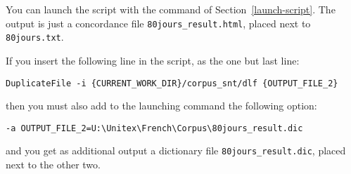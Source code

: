 \noindent You can launch the script with the command of Section~\ref{launch-script}. The output
is just a concordance file \verb$80jours_result.html$, placed next to \verb$80jours.txt$.

\bigskip
\noindent If you insert the following line in the script, as the one but last line:

\begin{Verbatim}[fontsize=\small,fontfamily=helvetica]
DuplicateFile -i {CURRENT_WORK_DIR}/corpus_snt/dlf {OUTPUT_FILE_2}
\end{Verbatim}

\noindent then you must also add to the launching command the following option:

\begin{Verbatim}[fontsize=\small,fontfamily=helvetica]
-a OUTPUT_FILE_2=U:\Unitex\French\Corpus\80jours_result.dic
\end{Verbatim}

\noindent and you get as additional output a dictionary file \verb$80jours_result.dic$, 
placed next to the other two.
